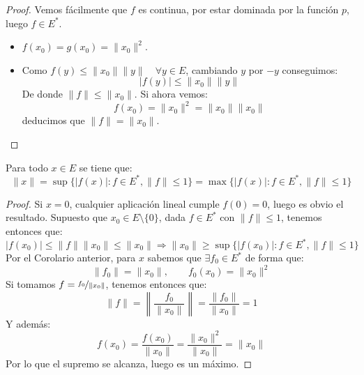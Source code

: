 \begin{coro}
\begin{proof}
            \noindent
            Vemos fácilmente que $f$ es continua, por estar dominada por la función $p$, luego $f\in E^\ast$.
            \begin{itemize}
                \item $f(x_0) = g(x_0) = \|x_0\|^2$.
                \item Como $f(y)\leq \|x_0\|\|y\| \quad \forall y\in E$, cambiando $y$ por $-y$ conseguimos:
                    \begin{equation*}
                        |f(y)| \leq \|x_0\|\|y\|
                    \end{equation*}
                    De donde $\|f\| \leq \|x_0\|$. Si ahora vemos:
                    \begin{equation*}
                        f(x_0) = \|x_0\|^2 = \|x_0\|\|x_0\|
                    \end{equation*}
                    deducimos que $\|f\| = \|x_0\|$.
            \end{itemize}
    \end{proof}
\end{coro}

\begin{coro}
    Para todo $x\in E$ se tiene que:
    \begin{equation*}
        \|x\| = \sup\{|f(x)| : f\in E^\ast, \|f\| \leq 1\} = \max\{|f(x)| : f\in E^\ast, \|f\| \leq 1\}
    \end{equation*}
    \begin{proof}
        Si $x=0$, cualquier aplicación lineal cumple $f(0)=0$, luego es obvio el resultado. Supuesto que $x_0\in E\setminus\{0\}$, dada $f\in E^\ast$ con $\|f\| \leq 1$, tenemos entonces que:
        \begin{equation*}
            |f(x_0)| \leq \|f\|\|x_0\| \leq \|x_0\| \Longrightarrow \|x_0\| \geq \sup\{|f(x_0)| : f\in E^\ast, \|f\| \leq 1\} 
        \end{equation*}
        Por el Corolario anterior, para $x$ sabemos que $\exists f_0\in E^\ast$ de forma que:
        \begin{equation*}
            \|f_0\| = \|x_0\|, \qquad f_0(x_0) = \|x_0\|^2
        \end{equation*}
        Si tomamos $f = \nicefrac{f_0}{\|x_0\|}$, tenemos entonces que:
        \begin{equation*}
            \|f\| = \left\|\dfrac{f_0}{\|x_0\|}\right\| = \dfrac{\|f_0\|}{\|x_0\|} = 1
        \end{equation*}
        Y además:
        \begin{equation*}
            f(x_0) = \dfrac{f(x_0)}{\|x_0\|} = \dfrac{\|x_0\|^2}{\|x_0\|} = \|x_0\|
        \end{equation*}
        Por lo que el supremo se alcanza, luego es un máximo.
    \end{proof}
\end{coro}

